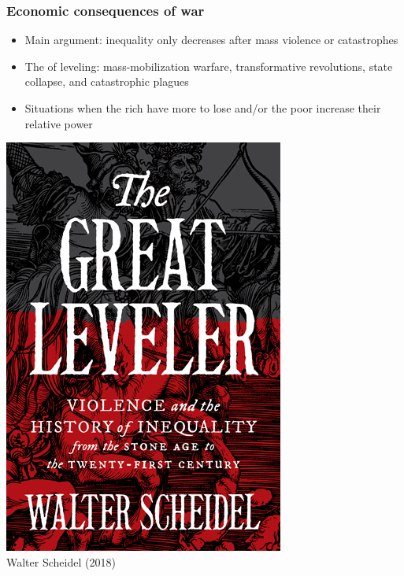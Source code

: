 \documentclass[aspectratio=43]{beamer}
\begin{document}
\begin{frame}
\frametitle{Economic consequences of war}
\centering

\begin{minipage}{0.59\textwidth}\centering
\begin{itemize}
  \item<2-> Main argument: inequality only decreases after mass violence or catastrophes
  \item<3-> The  of leveling: mass-mobilization warfare, transformative revolutions, state collapse, and catastrophic plagues
  \item<4-> Situations when the rich have more to lose and/or the poor increase their relative power
\end{itemize}
\end{minipage}\hfill
\begin{minipage}{0.39\textwidth}\centering
\includegraphics[width = \textwidth]{img/scheidel}\\\vspace{10pt}
{\small Walter Scheidel (2018)}
\end{minipage}

\end{frame}
\end{document}
